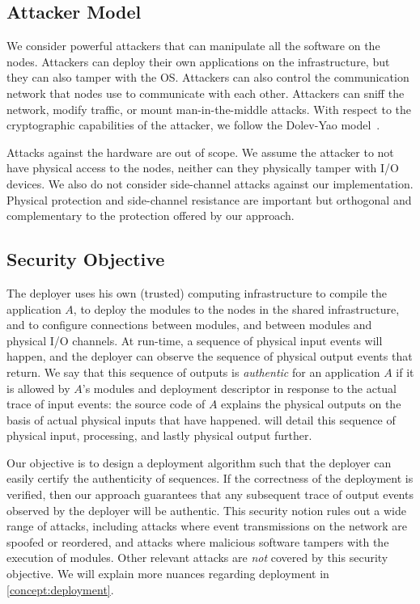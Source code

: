 \subsection{Attacker Model}
\label{concept:attacker}
%
We consider powerful attackers that can manipulate all the software on the
nodes. Attackers can deploy their own applications on the infrastructure, but
they can also tamper with the OS. Attackers can also control the communication
network that nodes use to communicate with each other. Attackers can sniff the
network, modify traffic, or mount man-in-the-middle attacks. With respect to the
cryptographic capabilities of the attacker, we follow the Dolev-Yao
model~\cite{dolev1983security}.

Attacks against the hardware are out of
scope. We assume the attacker to not have
physical access to the nodes, neither can they physically tamper with I/O
devices. We also do not consider side-channel attacks against our
implementation. Physical protection and side-channel resistance are important
but orthogonal and complementary to the protection offered by our approach.

\subsection{Security Objective}
\label{concept:goals}
\label{concept:deployer-tcb}

The deployer uses his own (trusted) computing infrastructure to compile the
application $A$, to deploy the modules to the nodes in the shared
infrastructure, and to configure connections between modules, and between
modules and physical I/O channels. At run-time, a sequence of physical input
events will happen, and the deployer can observe the sequence of physical output
events that return. We say that this sequence of outputs is \emph{authentic} for
an application $A$ if it is allowed by $A$'s modules and deployment descriptor
in response to the actual trace of input events: the source code of $A$ explains
the physical outputs on the basis of actual physical inputs that have happened.
 will detail this sequence of physical input,
processing, and lastly physical output further.

Our objective is to design a deployment algorithm such that the deployer can
easily certify the authenticity of sequences. If the correctness of the
deployment is verified, then our approach guarantees that any subsequent trace
of output events observed by the deployer will be authentic.
%
This security notion rules out a wide range of attacks, including attacks where
event transmissions on the network are spoofed or reordered, and attacks where
malicious software tampers with the execution of modules. Other relevant attacks
are \emph{not} covered by this security objective. We will explain more nuances
regarding deployment in \cref{concept:deployment}.


